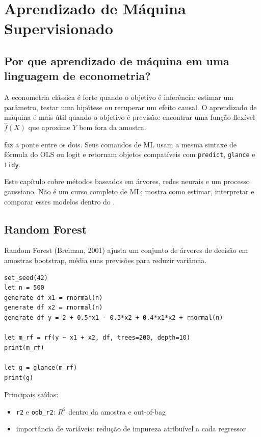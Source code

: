 \chapter{Aprendizado de Máquina Supervisionado}

\section{Por que aprendizado de máquina em uma linguagem de econometria?}

A econometria clássica é forte quando o objetivo é inferência:
estimar um parâmetro, testar uma hipótese ou recuperar um efeito
causal. O aprendizado de máquina é mais útil quando o objetivo é
previsão: encontrar uma função flexível $\hat f(X)$ que aproxime $Y$
bem fora da amostra.

\hayashi{} faz a ponte entre os dois. Seus comandos de ML usam a mesma
sintaxe de fórmula do OLS ou logit e retornam objetos compatíveis com
\texttt{predict}, \texttt{glance} e \texttt{tidy}.

Este capítulo cobre métodos baseados em árvores, redes neurais e um
processo gaussiano. Não é um curso completo de ML; mostra como estimar,
interpretar e comparar esses modelos dentro do \hayashi{}.

\section{Random Forest}

Random Forest (Breiman, 2001) ajusta um conjunto de árvores de decisão
em amostras bootstrap, média suas previsões para reduzir variância.

\begin{lstlisting}[caption={Regressão com Random Forest}]
set_seed(42)
let n = 500
generate df x1 = rnormal(n)
generate df x2 = rnormal(n)
generate df y = 2 + 0.5*x1 - 0.3*x2 + 0.4*x1*x2 + rnormal(n)

let m_rf = rf(y ~ x1 + x2, df, trees=200, depth=10)
print(m_rf)

let g = glance(m_rf)
print(g)
\end{lstlisting}

Principais saídas:

\begin{itemize}
\item \texttt{r2} e \texttt{oob\_r2}: $R^2$ dentro da amostra e out-of-bag
\item importância de variáveis: redução de impureza atribuível a cada
      regressor
\end{itemize}

